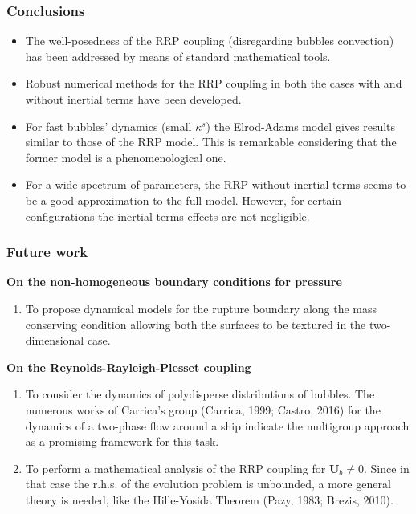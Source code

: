 \documentclass[10pt,aspectratio=169]{beamer}
\begin{document}
\begin{frame}
\frametitle{Conclusions}
\begin{itemize}
	\item The well-posedness of the RRP coupling (disregarding bubbles convection) has been addressed by means of standard mathematical tools.
	\item Robust numerical methods for the RRP coupling in both the cases with and without inertial terms have been developed.
	
	\item For fast bubbles' dynamics (small $\kappa^s$) the Elrod-Adams model gives results similar to those of the RRP model. This is remarkable considering that the former model is a phenomenological one.
	
	\item For a wide spectrum of parameters, the RRP without inertial terms seems to be a good approximation to the full model. However, for certain configurations the inertial terms effects are not negligible.
\end{itemize}
\end{frame}  

\begin{frame}
\frametitle{Future work}
\vspace*{0.5cm}
\noindent\textbf{On the non-homogeneous boundary conditions for pressure}
\begin{enumerate}
	\item To propose dynamical models for the rupture boundary along the mass conserving condition allowing both the surfaces to be textured in the two-dimensional case.
\end{enumerate}

\noindent\textbf{On the Reynolds-Rayleigh-Plesset coupling}
\begin{enumerate}
	\item To consider the dynamics of polydisperse distributions of bubbles. The numerous works of Carrica's group (Carrica, 1999; Castro, 2016) for the dynamics of a two-phase flow around a ship indicate the multigroup approach as a promising framework for this task.%
	
	\item To perform a mathematical analysis of the RRP coupling for $\mathbf{U}_b\neq 0$. Since in that case the r.h.s. of the evolution problem is unbounded, a more general theory is needed, like the Hille-Yosida Theorem (Pazy, 1983; Brezis, 2010).
\end{enumerate}
\end{frame}  
\end{document}
